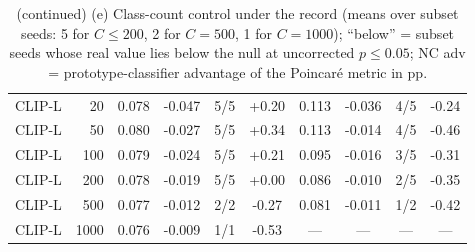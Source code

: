 \begin{table}[H]
\begin{tabular}{lr|cccc|cccc}
CLIP-L & 20 & 0.078 & -0.047 & 5/5 & +0.20 & 0.113 & -0.036 & 4/5 & -0.24 \\
CLIP-L & 50 & 0.080 & -0.027 & 5/5 & +0.34 & 0.113 & -0.014 & 4/5 & -0.46 \\
CLIP-L & 100 & 0.079 & -0.024 & 5/5 & +0.21 & 0.095 & -0.016 & 3/5 & -0.31 \\
CLIP-L & 200 & 0.078 & -0.019 & 5/5 & +0.00 & 0.086 & -0.010 & 2/5 & -0.35 \\
CLIP-L & 500 & 0.077 & -0.012 & 2/2 & -0.27 & 0.081 & -0.011 & 1/2 & -0.42 \\
CLIP-L & 1000 & 0.076 & -0.009 & 1/1 & -0.53 & --- & --- & --- & --- \\
\bottomrule
\end{tabular}
\par\vspace{5pt}
\endgroup
\caption{(continued) (e) Class-count control under the record (means over subset seeds: 5 for $C\le200$, 2 for $C{=}500$, 1 for $C{=}1000$); ``below'' = subset seeds whose real value lies below the null at uncorrected $p\le0.05$; NC adv = prototype-classifier advantage of the Poincar\'{e} metric in pp. %
}
\end{table}
